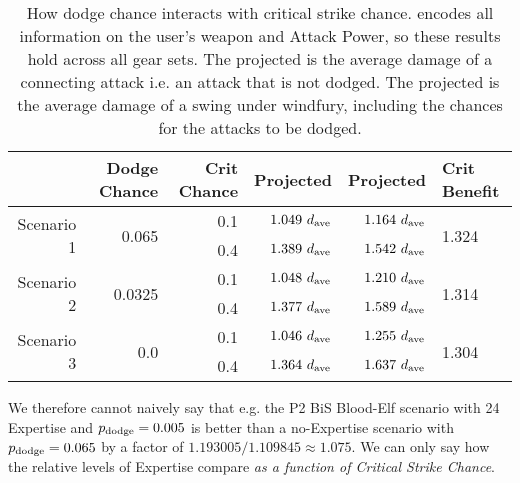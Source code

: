 \begin{table}[htb]
	\centering
	\begin{tabular}{ r | r | r | r | r | l }
		  \multicolumn{1}{c|}{}  & Dodge Chance & Crit Chance & Projected \dphys & Projected \dwf & Crit Benefit \\
		\hline \hline
		\multirow{2}{*}{Scenario 1}	 &	\multirow{2}{*}{0.065} & 0.1 & $1.049~d_{\mathrm{ave}} $ & $1.164~d_{\mathrm{ave}} $ & \multirow{2}{*}{1.324} \\
					&  & 0.4 & $1.389~d_{\mathrm{ave}} $ & $1.542~d_{\mathrm{ave}} $ & \\
		\hline
		
		\multirow{2}{*}{Scenario 2}	 &	\multirow{2}{*}{0.0325} & 0.1 & $1.048~d_{\mathrm{ave}} $ & $1.210~d_{\mathrm{ave}} $ & \multirow{2}{*}{1.314} \\
		&  & 0.4 & $1.377~d_{\mathrm{ave}} $ & $1.589~d_{\mathrm{ave}} $ & \\
		\hline
		
		\multirow{2}{*}{Scenario 3}	 &	\multirow{2}{*}{0.0} & 0.1 & $1.046~d_{\mathrm{ave}} $ & $1.255~d_{\mathrm{ave}} $ & \multirow{2}{*}{1.304} \\
		&  & 0.4 & $1.364~d_{\mathrm{ave}} $ & $1.637~d_{\mathrm{ave}} $ & \\
		\hline
		
	\end{tabular}
	\caption{How dodge chance interacts with critical strike chance.
		\dave encodes all information on the user's weapon and Attack Power, so these results hold across all gear sets.
	The projected \dphys is the average damage of a connecting attack i.e. an attack that is not dodged.
	The projected \dwf is the average damage of a swing under windfury, including the chances for the attacks to be dodged.}		
	\label{tab:wfautos}
\end{table}

We therefore cannot naively say that e.g. the P2 BiS Blood-Elf scenario with 24 Expertise and $p_{\mathrm{dodge}}  = 0.005$ is better than a no-Expertise scenario with $p_{\mathrm{dodge}}  = 0.065$ by a factor of $1.193005/1.109845 \approx 1.075$.
We can only say how the relative levels of Expertise compare \emph{as a function of Critical Strike Chance}.


